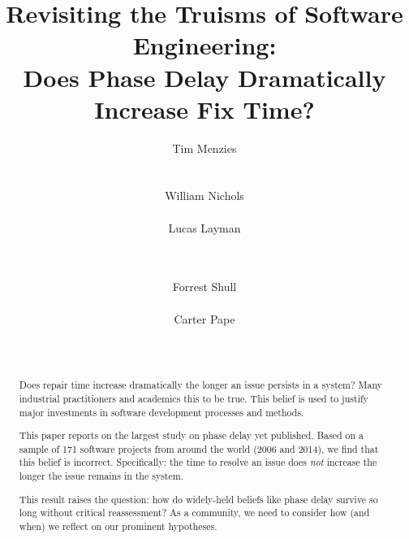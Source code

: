 \documentclass{sig-alternate}
\begin{document}
\title{Revisiting the Truisms of Software Engineering:\\ Does Phase Delay Dramatically Increase  Fix Time?}
\author{
\alignauthor 
Tim Menzies \\
       \\
       \\
\alignauthor 
William Nichols \\
        \\
\alignauthor 
Lucas Layman \\
        \\
       \\ 
\and
\alignauthor 
Forrest Shull \\
        \\
\alignauthor 
Carter Pape \\
       \\
       \\
} 
\maketitle
\begin{abstract}
Does
repair time increase dramatically
the longer an issue persists in a system?
Many industrial practitioners and academics this   to be true.
This   belief is used to justify 
major investments in  software development
 processes and methods.

This
paper reports on the largest study on phase delay yet published.
Based on a sample of 
171 software projects from around the world (2006 and 2014),
 we find that this belief is  
incorrect. Specifically: the    time  to resolve an
issue   does {\em not} increase
the longer the issue remains in the system.    

This result raises the question: how do widely-held beliefs like phase delay survive so long  without  critical reassessment?  As a community, we need to consider how (and when) we reflect on our prominent hypotheses.
\end{abstract}
\end{document}
